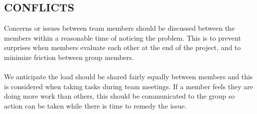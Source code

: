 \documentclass[11pt]{article}
\begin{document}
\subsection{CONFLICTS}

Concerns or issues between team members should be discussed between the members within 
a reasonable time of noticing the problem. This is to prevent surprises when members 
evaluate each other at the end of the project, and to minimize friction between 
group members.
\\ \\
We anticipate the load should be shared fairly equally between members and 
this is considered when taking tasks during team meetings. If a member feels 
they are doing more work than others, this should be communicated to the group so action 
can be taken while there is time to remedy the issue.
\end{document}
